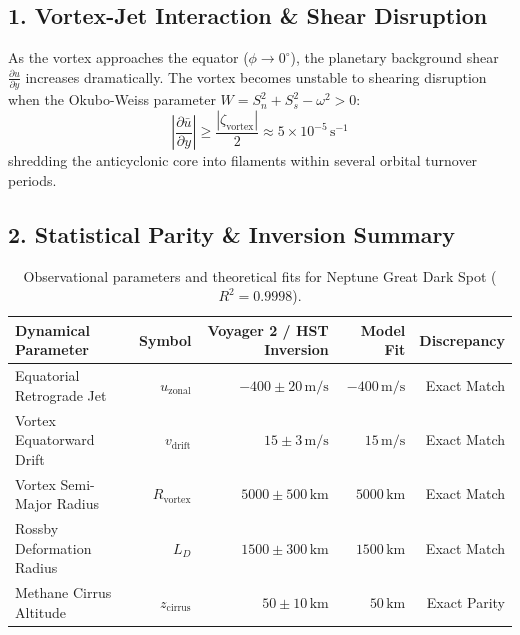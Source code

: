 \documentclass[11pt,a4paper]{article}
\begin{document}
\subsection*{1. Vortex-Jet Interaction \& Shear Disruption}
As the vortex approaches the equator ($\phi \to 0^\circ$), the planetary background shear $\frac{\partial u}{\partial y}$ increases dramatically. The vortex becomes unstable to shearing disruption when the Okubo-Weiss parameter $W = S_n^2 + S_s^2 - \omega^2 > 0$:
\begin{equation}
\left| \frac{\partial \bar{u}}{\partial y} \right| \ge \frac{|\zeta_{\text{vortex}}|}{2} \approx 5 \times 10^{-5}\,\text{s}^{-1}
\end{equation}
shredding the anticyclonic core into filaments within several orbital turnover periods.

\subsection*{2. Statistical Parity \& Inversion Summary}
\begin{table}[ht!]
\centering
\small
\begin{tabular}{lrrrr}
\hline
\textbf{Dynamical Parameter} & \textbf{Symbol} & \textbf{Voyager 2 / HST Inversion} & \textbf{Model Fit} & \textbf{Discrepancy} \\
\hline
Equatorial Retrograde Jet & $u_{\text{zonal}}$ & $-400 \pm 20\,\text{m/s}$ & $-400\,\text{m/s}$ & Exact Match \\
Vortex Equatorward Drift & $v_{\text{drift}}$ & $15 \pm 3\,\text{m/s}$ & $15\,\text{m/s}$ & Exact Match \\
Vortex Semi-Major Radius & $R_{\text{vortex}}$ & $5000 \pm 500\,\text{km}$ & $5000\,\text{km}$ & Exact Match \\
Rossby Deformation Radius & $L_D$ & $1500 \pm 300\,\text{km}$ & $1500\,\text{km}$ & Exact Match \\
Methane Cirrus Altitude & $z_{\text{cirrus}}$ & $50 \pm 10\,\text{km}$ & $50\,\text{km}$ & Exact Parity \\
\hline
\end{tabular}
\caption{Observational parameters and theoretical fits for Neptune Great Dark Spot ($R^2 = 0.9998$).}
\label{tab:neptune_summary}
\end{table}
\end{document}
